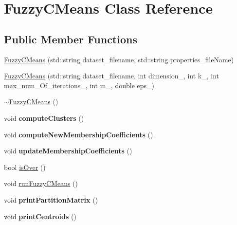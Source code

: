 \hypertarget{class_fuzzy_c_means}{}\section{Fuzzy\+C\+Means Class Reference}
\label{class_fuzzy_c_means}
\subsection*{Public Member Functions}
\begin{DoxyCompactItemize}
\item 
\mbox{\hyperlink{class_fuzzy_c_means_a061d8ad3ae21e92a3a1e6b7d005ca3cf}{Fuzzy\+C\+Means}} (std\+::string dataset\+\_\+filename, std\+::string properties\+\_\+file\+Name)
\item 
\mbox{\hyperlink{class_fuzzy_c_means_a24014c19f6ab66fdb228bd2fc9588ce1}{Fuzzy\+C\+Means}} (std\+::string dataset\+\_\+filename, int dimension\+\_\+, int k\+\_\+, int max\+\_\+num\+\_\+\+Of\+\_\+iterations\+\_\+, int m\+\_\+, double eps\+\_\+)
\item 
\mbox{\hyperlink{class_fuzzy_c_means_ae3175d6a98d93d476c37da164252f7de}{$\sim$\+Fuzzy\+C\+Means}} ()
\item 
\mbox{\label{class_fuzzy_c_means_ab3b80b7e5ab918bfd801e1df9a370390}} 
void {\bfseries compute\+Clusters} ()
\item 
\mbox{\label{class_fuzzy_c_means_a3a9758bfef32ece7efa7c17a65f55371}} 
void {\bfseries compute\+New\+Membership\+Coefficients} ()
\item 
\mbox{\label{class_fuzzy_c_means_a80c4f0bfed3da5b0e0f910085d826727}} 
void {\bfseries update\+Membership\+Coefficients} ()
\item 
bool \mbox{\hyperlink{class_fuzzy_c_means_acd89ddb387a57ddc8838ed29c9ec31bd}{is\+Over}} ()
\item 
void \mbox{\hyperlink{class_fuzzy_c_means_a79db259f351e533d5c9d011b41935152}{run\+Fuzzy\+C\+Means}} ()
\item 
\mbox{\label{class_fuzzy_c_means_abe9686594626cb7867da45fadd8a44ce}} 
void {\bfseries print\+Partition\+Matrix} ()
\item 
\mbox{\label{class_fuzzy_c_means_adaf587cc5ae0613f373860079d9b9447}} 
void {\bfseries print\+Centroids} ()
\end{DoxyCompactItemize}
